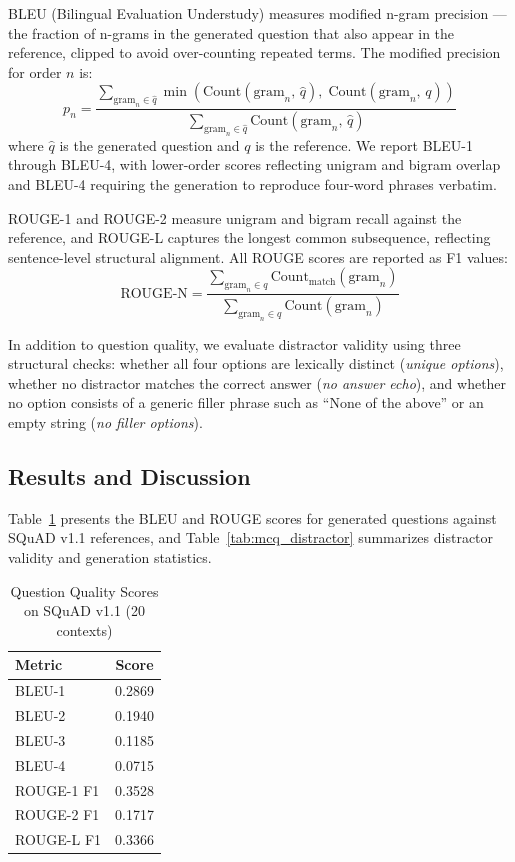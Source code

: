 BLEU (Bilingual Evaluation Understudy) measures modified n-gram precision — the fraction of n-grams in the generated question that also appear in the reference, clipped to avoid over-counting repeated terms. The modified precision for order $n$ is:
\[
p_n = \frac{\displaystyle\sum_{\text{gram}_n \in \hat{q}} \min\!\left(\text{Count}(\text{gram}_n,\, \hat{q}),\; \text{Count}(\text{gram}_n,\, q)\right)}{\displaystyle\sum_{\text{gram}_n \in \hat{q}} \text{Count}(\text{gram}_n,\, \hat{q})}
\]
where $\hat{q}$ is the generated question and $q$ is the reference. We report BLEU-1 through BLEU-4, with lower-order scores reflecting unigram and bigram overlap and BLEU-4 requiring the generation to reproduce four-word phrases verbatim.

ROUGE-1 and ROUGE-2 measure unigram and bigram recall against the reference, and ROUGE-L captures the longest common subsequence, reflecting sentence-level structural alignment. All ROUGE scores are reported as F1 values:
\[
\text{ROUGE-N} = \frac{\displaystyle\sum_{\text{gram}_n \in q} \text{Count}_{\text{match}}(\text{gram}_n)}{\displaystyle\sum_{\text{gram}_n \in q} \text{Count}(\text{gram}_n)}
\]

In addition to question quality, we evaluate distractor validity using three structural checks: whether all four options are lexically distinct (\textit{unique options}), whether no distractor matches the correct answer (\textit{no answer echo}), and whether no option consists of a generic filler phrase such as ``None of the above'' or an empty string (\textit{no filler options}).

\subsection{Results and Discussion}

Table~\ref{tab:mcq_question} presents the BLEU and ROUGE scores for generated questions against SQuAD v1.1 references, and Table~\ref{tab:mcq_distractor} summarizes distractor validity and generation statistics.

\begin{table}[h!]
\centering
\caption{Question Quality Scores on SQuAD v1.1 (20 contexts)}
\label{tab:mcq_question}
\begin{tabular}{|l|c|}
\hline
\textbf{Metric} & \textbf{Score} \\
\hline
BLEU-1    & 0.2869 \\
\hline
BLEU-2    & 0.1940 \\
\hline
BLEU-3    & 0.1185 \\
\hline
BLEU-4    & 0.0715 \\
\hline
ROUGE-1 F1 & 0.3528 \\
\hline
ROUGE-2 F1 & 0.1717 \\
\hline
ROUGE-L F1 & 0.3366 \\
\hline
\end{tabular}
\end{table}

